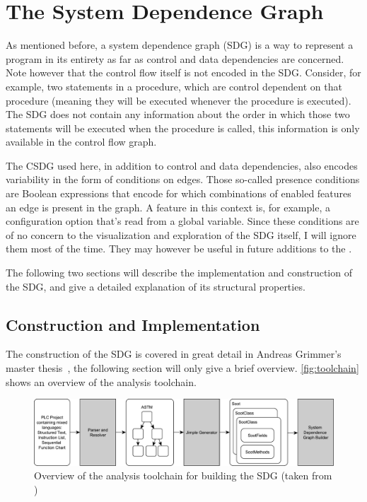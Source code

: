 \chapter{The System Dependence Graph} \label{ch:sdg}

As mentioned before, a system dependence graph (SDG) is a way to represent a program in its entirety as far as control 
and data dependencies are concerned. Note however that the control flow itself is not encoded in the SDG. Consider, for 
example, two statements in a procedure, which are control dependent on that procedure (meaning they will be executed 
whenever the procedure is executed). The SDG does not contain any information about the order in which those two 
statements will be executed when the procedure is called, this information is only available in the control flow graph.

The CSDG used here, in addition to control and data dependencies, also encodes variability in the form of conditions on 
edges. Those so-called presence conditions are Boolean expressions that encode for which combinations of enabled 
features an edge is present in the graph. A feature in this context is, for example, a configuration option that's read 
from a global variable. Since these conditions are of no concern to the visualization and exploration of the SDG 
itself, I will ignore them most of the time. They may however be useful in future additions to the \SB.

The following two sections will describe the implementation and construction of the SDG, and give a detailed 
explanation of its structural properties.


\section{Construction and Implementation}

The construction of the SDG is covered in great detail in Andreas Grimmer's master thesis~\cite{GrimmerDA}, the 
following section will only give a brief overview. \autoref{fig:toolchain} shows an overview of the analysis toolchain.

\begin{figure}[ht]
  \centering
    \includegraphics[width=\textwidth]{bilder/toolchain}
  \caption{Overview of the analysis toolchain for building the SDG (taken from \cite{GrimmerDA})}
  \label{fig:toolchain}
\end{figure}

